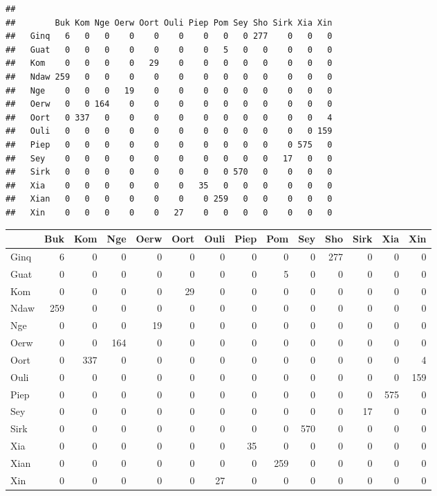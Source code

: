 \documentclass[
]{article}
\begin{document}
\begin{verbatim}
##       
##        Buk Kom Nge Oerw Oort Ouli Piep Pom Sey Sho Sirk Xia Xin
##   Ginq   6   0   0    0    0    0    0   0   0 277    0   0   0
##   Guat   0   0   0    0    0    0    0   5   0   0    0   0   0
##   Kom    0   0   0    0   29    0    0   0   0   0    0   0   0
##   Ndaw 259   0   0    0    0    0    0   0   0   0    0   0   0
##   Nge    0   0   0   19    0    0    0   0   0   0    0   0   0
##   Oerw   0   0 164    0    0    0    0   0   0   0    0   0   0
##   Oort   0 337   0    0    0    0    0   0   0   0    0   0   4
##   Ouli   0   0   0    0    0    0    0   0   0   0    0   0 159
##   Piep   0   0   0    0    0    0    0   0   0   0    0 575   0
##   Sey    0   0   0    0    0    0    0   0   0   0   17   0   0
##   Sirk   0   0   0    0    0    0    0   0 570   0    0   0   0
##   Xia    0   0   0    0    0    0   35   0   0   0    0   0   0
##   Xian   0   0   0    0    0    0    0 259   0   0    0   0   0
##   Xin    0   0   0    0    0   27    0   0   0   0    0   0   0
\end{verbatim}

\begin{longtable}[]{@{}lrrrrrrrrrrrrr@{}}
\toprule
& Buk & Kom & Nge & Oerw & Oort & Ouli & Piep & Pom & Sey & Sho & Sirk &
Xia & Xin \\
\midrule
\endhead
Ginq & 6 & 0 & 0 & 0 & 0 & 0 & 0 & 0 & 0 & 277 & 0 & 0 & 0 \\
Guat & 0 & 0 & 0 & 0 & 0 & 0 & 0 & 5 & 0 & 0 & 0 & 0 & 0 \\
Kom & 0 & 0 & 0 & 0 & 29 & 0 & 0 & 0 & 0 & 0 & 0 & 0 & 0 \\
Ndaw & 259 & 0 & 0 & 0 & 0 & 0 & 0 & 0 & 0 & 0 & 0 & 0 & 0 \\
Nge & 0 & 0 & 0 & 19 & 0 & 0 & 0 & 0 & 0 & 0 & 0 & 0 & 0 \\
Oerw & 0 & 0 & 164 & 0 & 0 & 0 & 0 & 0 & 0 & 0 & 0 & 0 & 0 \\
Oort & 0 & 337 & 0 & 0 & 0 & 0 & 0 & 0 & 0 & 0 & 0 & 0 & 4 \\
Ouli & 0 & 0 & 0 & 0 & 0 & 0 & 0 & 0 & 0 & 0 & 0 & 0 & 159 \\
Piep & 0 & 0 & 0 & 0 & 0 & 0 & 0 & 0 & 0 & 0 & 0 & 575 & 0 \\
Sey & 0 & 0 & 0 & 0 & 0 & 0 & 0 & 0 & 0 & 0 & 17 & 0 & 0 \\
Sirk & 0 & 0 & 0 & 0 & 0 & 0 & 0 & 0 & 570 & 0 & 0 & 0 & 0 \\
Xia & 0 & 0 & 0 & 0 & 0 & 0 & 35 & 0 & 0 & 0 & 0 & 0 & 0 \\
Xian & 0 & 0 & 0 & 0 & 0 & 0 & 0 & 259 & 0 & 0 & 0 & 0 & 0 \\
Xin & 0 & 0 & 0 & 0 & 0 & 27 & 0 & 0 & 0 & 0 & 0 & 0 & 0 \\
\bottomrule
\end{longtable}
\end{document}
